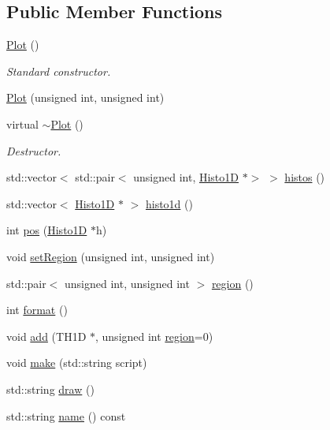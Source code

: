 \subsection*{Public Member Functions}
\begin{DoxyCompactItemize}
\item 
\hyperlink{classPlot_ae8dca35f270d0964aac1e4ff42259129}{Plot} ()
\begin{DoxyCompactList}\small\item\em Standard constructor. \end{DoxyCompactList}\item 
\hyperlink{classPlot_a4e89bc6ea1800ba9697c9e0a0dc50a2e}{Plot} (unsigned int, unsigned int)
\item 
virtual \hyperlink{classPlot_a277e9c79c4357b3a317d74d61dabefcf}{$\sim$\+Plot} ()
\begin{DoxyCompactList}\small\item\em Destructor. \end{DoxyCompactList}\item 
std\+::vector$<$ std\+::pair$<$ unsigned int, \hyperlink{classHisto1D}{Histo1D} $\ast$$>$ $>$ \hyperlink{classPlot_af72e70c6b53df941708cd8d971083227}{histos} ()
\item 
std\+::vector$<$ \hyperlink{classHisto1D}{Histo1D} $\ast$ $>$ \hyperlink{classPlot_ad6f34fe5ab1a94b411b4fc121e0641bc}{histo1d} ()
\item 
int \hyperlink{classPlot_a3f7d4915b045844af0773d09d0c185ad}{pos} (\hyperlink{classHisto1D}{Histo1D} $\ast$h)
\item 
void \hyperlink{classPlot_a77a015d72e98d6fb066481e9c70af1ec}{set\+Region} (unsigned int, unsigned int)
\item 
std\+::pair$<$ unsigned int, unsigned int $>$ \hyperlink{classPlot_ae493b21749049d75cbb7282b1e1b9ab4}{region} ()
\item 
int \hyperlink{classPlot_a4a7404547e8a9d5dd0a921bfff3ed406}{format} ()
\item 
void \hyperlink{classPlot_ac0e03af81b0591d4786ff03441524eb2}{add} (T\+H1D $\ast$, unsigned int \hyperlink{classPlot_ae493b21749049d75cbb7282b1e1b9ab4}{region}=0)
\item 
void \hyperlink{classPlot_abe449e7c57a55f3bf0ee9201d07d497d}{make} (std\+::string script)
\item 
std\+::string \hyperlink{classPlot_aa49856f69c852f7f0ba65ed6131b7b61}{draw} ()
\item 
std\+::string \hyperlink{classObject_a300f4c05dd468c7bb8b3c968868443c1}{name} () const
$$
\end{DoxyCompactItemize}

